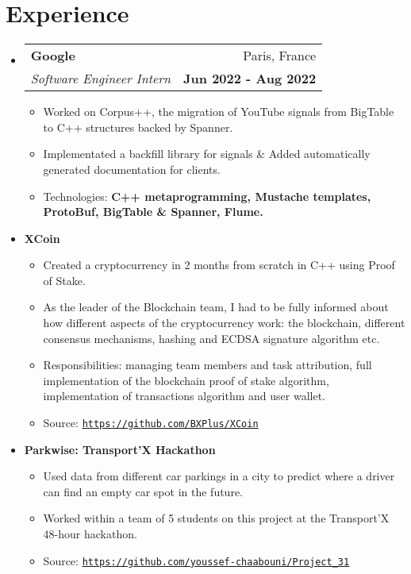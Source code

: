 \documentclass[letterpaper,11pt]{article}
\makeatletter
\newcommand{\resumeItem}[2]{
  \item\small{
    \textbf{#1}{#2 \vspace{-2pt}}
  }
}
\newcommand{\resumeSmallSubheading}[1]{
  \item
    \textbf{#1}\vspace{-5pt}
}
\newcommand{\resumeSubheading}[4]{
  \item
    \begin{tabular*}{0.97\textwidth}[t]{l@{\extracolsep{\fill}}r}
      \textbf{#1} & #2 \\
      \textit{\small#3} & \textbf{\small #4} \\
    \end{tabular*}\vspace{-5pt}
}
\newcommand{\resumeSubHeadingListStart}{\begin{itemize}[leftmargin=*]}
\newcommand{\resumeSubHeadingListEnd}{\end{itemize}}
\newcommand{\resumeItemListStart}{\begin{itemize}}
\newcommand{\resumeItemListEnd}{\end{itemize}\vspace{-5pt}}
\makeatother
\begin{document}
\section{Experience}
  \resumeSubHeadingListStart
    \resumeSubheading
      {Google}{Paris, France}
      {Software Engineer Intern}{Jun 2022 - Aug 2022}
      \resumeItemListStart
        \resumeItem{}
          {Worked on Corpus++, the migration of YouTube signals from BigTable to C++ structures backed by Spanner.}
        \resumeItem{}
          {Implementated a backfill library for signals \& Added  automatically generated documentation for clients.}
        \resumeItem{}
          {Technologies: \textbf{C++ metaprogramming, Mustache templates, ProtoBuf, BigTable \& Spanner, Flume.}}
      \resumeItemListEnd
    \resumeSmallSubheading{XCoin}
      \resumeItemListStart
        \resumeItem{}
          {Created a cryptocurrency in 2 months from scratch in C++ using Proof of Stake.}
        \resumeItem{}
          {As the leader of the Blockchain team, I had to be fully informed about how different aspects of the cryptocurrency work: the blockchain, different consensus mechanisms, hashing and ECDSA signature algorithm etc.}
        \resumeItem{}
          {Responsibilities: managing team members and task attribution, full implementation of the blockchain proof of stake algorithm, implementation of transactions algorithm and user wallet.}
        \resumeItem{}
          {Source: \texttt{\underline{\href{https://github.com/BXPlus/XCoin}{https://github.com/BXPlus/XCoin}}}}
      \resumeItemListEnd
    \resumeSmallSubheading{Parkwise: Transport'X Hackathon}
      \resumeItemListStart
        \resumeItem{}
          {Used data from different car parkings in a city to predict where a driver can find an empty car spot in the future.}
        \resumeItem{}
          {Worked within a team of 5 students on this project at the Transport'X 48-hour hackathon.}
        \resumeItem{}
          {Source: \texttt{\underline{\href{https://github.com/youssef-chaabouni/Project_31}{https://github.com/youssef-chaabouni/Project\_31}}}}
      \resumeItemListEnd

  \resumeSubHeadingListEnd


\end{document}
